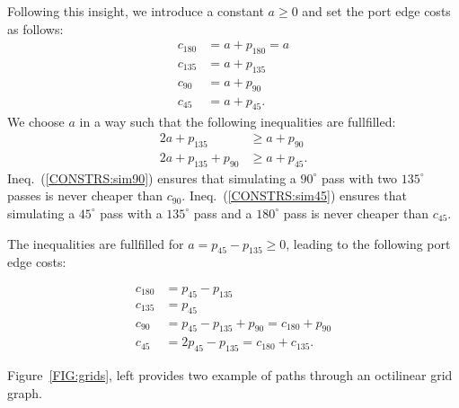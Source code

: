 \documentclass{sig-alternate-sigmod09}
\begin{document}
Following this insight, we introduce a constant $a \geq 0$ and set the port edge costs as follows:
\begin{align}
c_{180} &= a + p_{180} = a \\
c_{135} &= a + p_{135} \\
c_{90} &= a + p_{90} \\
c_{45} &= a + p_{45}.
\end{align}
We choose $a$ in a way such that the following inequalities are fullfilled:
\begin{align}
2a + p_{135} &\geq a + p_{90} \label{CONSTRS:sim90}\\
2a + p_{135} + p_{90} &\geq a + p_{45}\label{CONSTRS:sim45}.
\end{align}
Ineq.~(\ref{CONSTRS:sim90}) ensures that simulating a $90^{\circ}$ pass with two $135^{\circ}$ passes is never cheaper than $c_{90}$. Ineq.~(\ref{CONSTRS:sim45}) ensures that simulating a $45^{\circ}$ pass with a $135^{\circ}$ pass and a $180^{\circ}$ pass is never cheaper than $c_{45}$.

The inequalities are fullfilled for $a = p_{45} - p_{135} \geq 0$, leading to the following port edge costs:

\begin{align}
c_{180} &= p_{45} - p_{135} \\
c_{135} &= p_{45} \\
c_{90} &= p_{45} - p_{135} + p_{90} = c_{180} + p_{90} \\
c_{45} &= 2 p_{45} - p_{135} = c_{180} + c_{135}.
\end{align}

Figure~\ref{FIG:grids}, left provides two example of paths through an octilinear grid graph.
\end{document}
